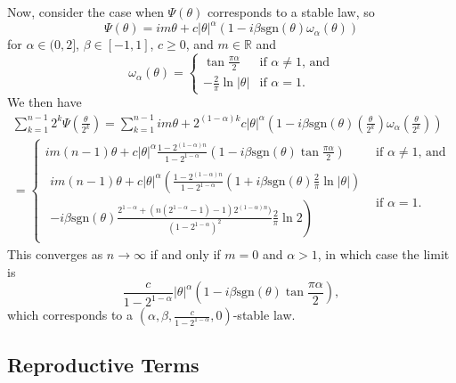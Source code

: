 \documentclass{article}
\theoremstyle{remark}
\theoremstyle{definition}
\begin{document}
Now, consider the case when $\Psi(\theta)$ corresponds to a stable law, so
\[
	\Psi(\theta) = im\theta + c|\theta|^{\alpha} (1-i\beta \text{sgn}(\theta)\omega_{\alpha}(\theta))
\]
for $\alpha \in (0,2]$, $\beta \in [-1,1]$, $c \geq 0$, and $m \in \mathbb{R}$ and
\[
	\omega_{\alpha}(\theta) = \begin{cases}
		\tan{\frac{\pi\alpha}{2}} & \text{if $\alpha \neq 1$, and}\\
		-\frac{2}{\pi}\ln{|\theta|} & \text{if $\alpha = 1$.}
	\end{cases}
\]
We then have
\begin{multline*}
	 \sum_{k=1}^{n-1}  {\textstyle 2^{k} \Psi\left(\frac{\theta}{2^{k}}\right)}
	 =  \sum_{k=1}^{n-1} im\theta + 2^{(1-\alpha)k} c|\theta|^{\alpha} {\textstyle\left(1-i \beta\text{sgn}(\theta)\left(\frac{\theta}{2^{k}}\right)
	 	 \omega_{\alpha}\left(\frac{\theta}{2^{k}}\right)\right)}\\
	= 
	\begin{cases}
		 im(n-1)\theta + c|\theta|^{\alpha}\frac{1-2^{(1-\alpha)n}}{1-2^{1-\alpha}}\left(1-i\beta \text{sgn}(\theta) \tan{\frac{\pi\alpha}{2}}\right) & \text{if $\alpha \neq 1$, and}\\	
		 \begin{multlined}
		 im(n-1)\theta + c|\theta|^{\alpha}  \left(\frac{1-2^{(1-\alpha)n}}{1-2^{1-\alpha}}
		 \left(1+i \beta \text{sgn}(\theta)\frac{2}{\pi}\ln{|\theta|} \right)\right.\\
		\left. -i\beta \text{sgn}(\theta) \frac{2^{1-\alpha} + (n(2^{1-\alpha}-1)-1)2^{(1-\alpha)n})}{(1-2^{1-\alpha})^{2}}\frac{2}{\pi}\ln{2}
		\right)    
		\end{multlined}
		& \text{if $\alpha = 1$.}
	\end{cases}
\end{multline*}
This converges as $n \to \infty$ if and only if $m = 0$ and $\alpha > 1$, in which case the limit is 
\[
	 \frac{c}{1-2^{1-\alpha}}|\theta|^{\alpha}\left(1-i\beta \text{sgn}(\theta) \tan{\frac{\pi\alpha}{2}}\right), 
\]
which corresponds to a $\left(\alpha,\beta, \frac{c}{1-2^{1-\alpha}},0\right)$-stable law.

\subsection{Reproductive Terms}
\end{document}
